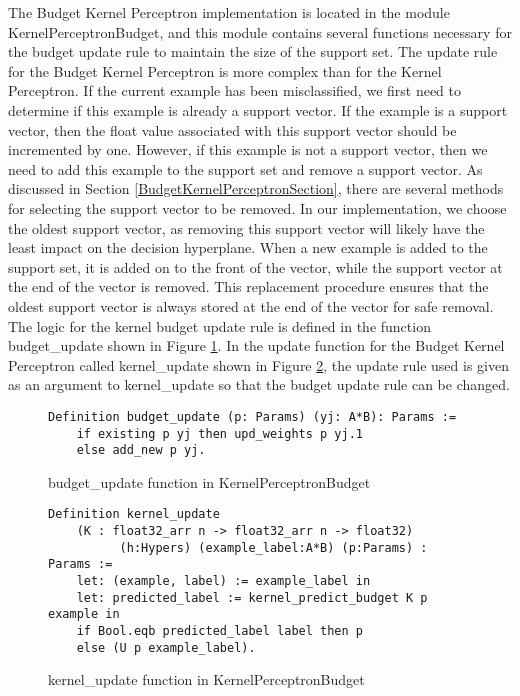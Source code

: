 The Budget Kernel Perceptron implementation is located in the module KernelPerceptronBudget, and this module contains several functions necessary for the budget update rule to maintain the size of the support set. The update rule for the Budget Kernel Perceptron is more complex than for the Kernel Perceptron. If the current example has been misclassified, we first need to determine if this example is already a support vector. If the example is a support vector, then the float value associated with this support vector should be incremented by one. However, if this example is not a support vector, then we need to add this example to the support set and remove a support vector. As discussed in Section \ref{BudgetKernelPerceptronSection}, there are several methods for selecting the support vector to be removed. In our implementation, we choose the oldest support vector, as removing this support vector will likely have the least impact on the decision hyperplane. When a new example is added to the support set, it is added on to the front of the vector, while the support vector at the end of the vector is removed. This replacement procedure ensures that the oldest support vector is always stored at the end of the vector for safe removal. The logic for the kernel budget update rule is defined in the function budget\_update shown in Figure \ref{budget_updateDef}. In the update function for the Budget Kernel Perceptron called kernel\_update shown in Figure \ref{kernel_update_budgetDef}, the update rule used is given as an argument to kernel\_update so that the budget update rule can be changed. 

\begin{figure}
    \caption{budget\_update function in KernelPerceptronBudget}
    \label{budget_updateDef}
    \begin{lstlisting}
Definition budget_update (p: Params) (yj: A*B): Params :=
    if existing p yj then upd_weights p yj.1
    else add_new p yj.
    \end{lstlisting}
\end{figure}


\begin{figure}
    \caption{kernel\_update function in KernelPerceptronBudget}
    \label{kernel_update_budgetDef}
    \begin{lstlisting}
Definition kernel_update 
    (K : float32_arr n -> float32_arr n -> float32)
          (h:Hypers) (example_label:A*B) (p:Params) : Params :=
    let: (example, label) := example_label in 
    let: predicted_label := kernel_predict_budget K p example in
    if Bool.eqb predicted_label label then p
    else (U p example_label).
    \end{lstlisting}
\end{figure}

